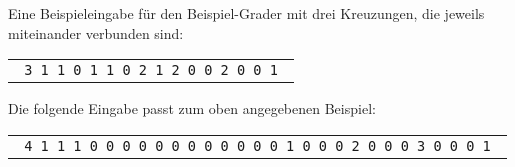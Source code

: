 \documentclass{boi2014-de}
\begin{document}
    Eine Beispieleingabe für den Beispiel-Grader mit drei Kreuzungen, die jeweils miteinander verbunden sind:

    \begin{center}
        \begin{tabular}{p{4cm}}
            {\tt
                3 \newline
                0 1 1 \newline
                1 0 1 \newline
                1 1 0 \newline
                1 \newline
                0 2 1 2 \newline
                2 0 0 2 \newline
                1 0 0 1 \newline
            }
        \end{tabular}
    \end{center}

    Die folgende Eingabe passt zum oben angegebenen Beispiel:

    \begin{center}
        \begin{tabular}{p{4cm}}
            {\tt
                4 \newline
                0 1 1 1 \newline
                1 0 0 0 \newline
                1 0 0 0 \newline
                1 0 0 0 \newline
                1 \newline
                0 0 0 0 1 \newline
                2 0 0 0 2 \newline
                3 0 0 0 3 \newline
                1 0 0 0 1 \newline
            }
        \end{tabular}
    \end{center}
\end{document}
